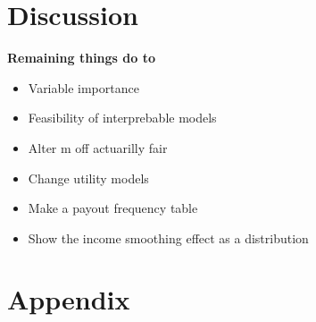 \documentclass[
  letterpaper,
  DIV=11,
  numbers=noendperiod]{scrartcl}
\begin{document}
\hypertarget{sec-discussion}{%
\section{Discussion}\label{sec-discussion}}

\textbf{Remaining things do to}

\begin{itemize}
\item
  Variable importance
\item
  Feasibility of interprebable models
\item
  Alter m off actuarilly fair
\item
  Change utility models
\item
  Make a payout frequency table
\item
  Show the income smoothing effect as a distribution
\end{itemize}

\hypertarget{sec-appendix}{%
\section{Appendix}\label{sec-appendix}}
\end{document}

